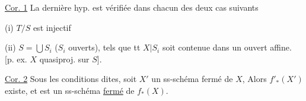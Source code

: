 \uline{Cor. 1} La dernière hyp.  est vérifiée dans chacun des deux cas suivants

(i) $T/S$ est  injectif

(ii) $S=\bigcup S_i$ ($S_i$ ouverts), tels que tt  $X\vert S_i$ soit contenue dans un ouvert affine.
[p. ex. $X$ quasiproj. sur $S$].

\uline{Cor. 2} Sous les conditions dites, soit $X'$ un ss-schéma fermé de $X$,  Alors $f'_*(X')$ existe, et est un ss-schéma \uline{fermé} de $f_*(X)$.
